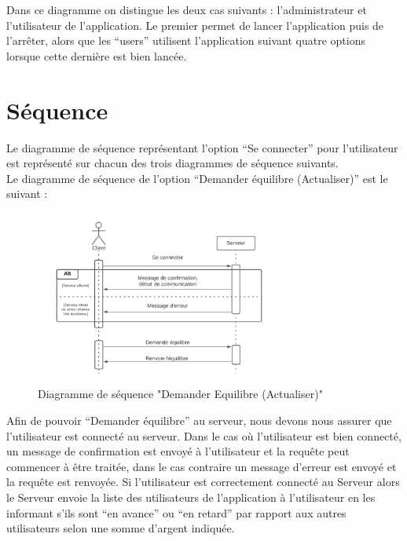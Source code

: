 \documentclass[12,french]{report}
\begin{document}
Dans ce diagramme on distingue les deux cas suivants : l’administrateur et l’utilisateur de l’application. Le premier permet de lancer l’application puis de l'arrêter, alors que les “users” utilisent l’application suivant quatre options lorsque cette dernière est bien lancée.


\section{Séquence}

Le diagramme de séquence représentant l’option “Se connecter” pour l’utilisateur est représenté sur chacun des trois diagrammes de séquence suivants.\\

Le diagramme de séquence de l’option “Demander équilibre (Actualiser)” est le suivant :\\


\begin{figure}[H]
	\center
	\includegraphics[width=0.7\textwidth]{./Images_pooa/Sequence_1}
	\caption{Diagramme de séquence "Demander Equilibre (Actualiser)"}
\end{figure}\vspace{0.2cm}

Afin de pouvoir “Demander équilibre” au serveur, nous devons nous assurer que l’utilisateur est connecté au serveur. Dans le cas où l’utilisateur est bien connecté, un message de confirmation est envoyé à l’utilisateur et la requête peut commencer à être traitée, dans le cas contraire un message d’erreur est envoyé et la requête est renvoyée. Si l’utilisateur est correctement connecté au Serveur alors le Serveur envoie la liste des utilisateurs de l’application à l’utilisateur en les informant s’ils sont “en avance” ou “en retard” par rapport aux autres utilisateurs selon une somme d’argent indiquée.\\
\end{document}
